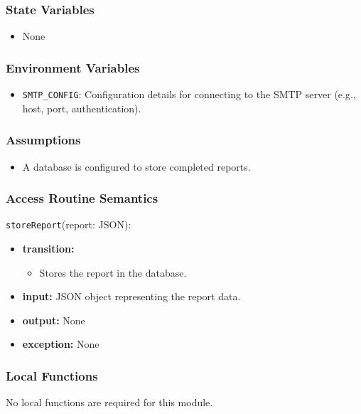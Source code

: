 \documentclass[12pt, titlepage]{article}
\begin{document}

\subsubsection{State Variables}

\begin{itemize}
    \item None
\end{itemize}

\subsubsection{Environment Variables}

\begin{itemize}
    \item \texttt{SMTP\_CONFIG}: Configuration details for connecting to the SMTP server (e.g., host, port, authentication).
\end{itemize}

\subsubsection{Assumptions}

\begin{itemize}
    \item A database is configured to store completed reports.
\end{itemize}

\subsubsection{Access Routine Semantics}

\noindent \texttt{storeReport}(report: JSON):
\begin{itemize}
    \item \textbf{transition:}
    \begin{itemize}
        \item Stores the report in the database.
    \end{itemize}
    \item \textbf{input:} JSON object representing the report data.
    \item \textbf{output:} None
    \item \textbf{exception:} None
\end{itemize}


\subsubsection{Local Functions}
No local functions are required for this module.
\end{document}
